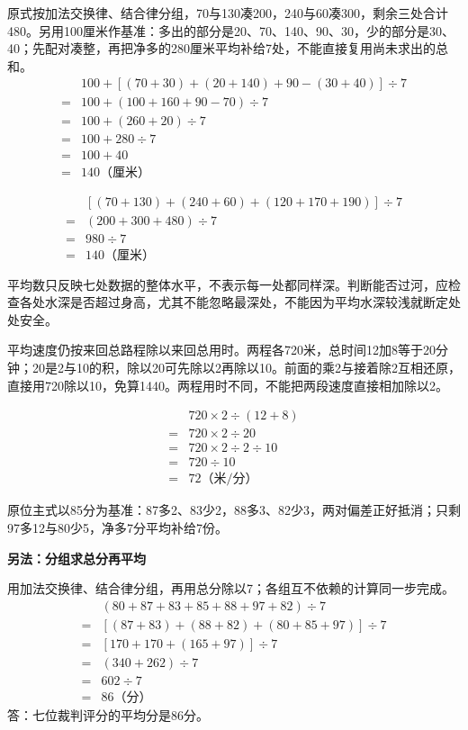 \documentclass[multi=snippet,border=0pt]{standalone}
\newenvironment{snippet}[3]{\begin{minipage}{#1bp}\color{answerred}\fontsize{#2}{#3}\selectfont\raggedright}{\end{minipage}}
\begin{document}
\begin{snippet}{505}{11.5}{14}原式按加法交换律、结合律分组，70与130凑200，240与60凑300，剩余三处合计480。另用100厘米作基准：多出的部分是20、70、140、90、30，少的部分是30、40；先配对凑整，再把净多的280厘米平均补给7处，不能直接复用尚未求出的总和。\[\begin{aligned}&100+[(70+30)+(20+140)+90-(30+40)]\div7\\={}&100+(100+160+90-70)\div7\\={}&100+(260+20)\div7\\={}&100+280\div7\\={}&100+40\\={}&140\text{（厘米）}\end{aligned}\]\end{snippet}
\begin{snippet}{369}{10.5}{12.8}\[\begin{aligned}&[(70+130)+(240+60)+(120+170+190)]\div7\\={}&(200+300+480)\div7\\={}&980\div7\\={}&140\text{（厘米）}\end{aligned}\]\end{snippet}
\begin{snippet}{505}{11.5}{14}平均数只反映七处数据的整体水平，不表示每一处都同样深。判断能否过河，应检查各处水深是否超过身高，尤其不能忽略最深处，不能因为平均水深较浅就断定处处安全。\end{snippet}
\begin{snippet}{505}{11.5}{14}平均速度仍按来回总路程除以来回总用时。两程各720米，总时间12加8等于20分钟；20是2与10的积，除以20可先除以2再除以10。前面的乘2与接着除2互相还原，直接用720除以10，免算1440。两程用时不同，不能把两段速度直接相加除以2。\end{snippet}
\begin{snippet}{344}{10.5}{12.8}\[\begin{aligned}&720\times2\div(12+8)\\={}&720\times2\div20\\={}&720\times2\div2\div10\\={}&720\div10\\={}&72\text{（米/分）}\end{aligned}\]\end{snippet}
\begin{snippet}{505}{11.5}{14}原位主式以85分为基准：87多2、83少2，88多3、82少3，两对偏差正好抵消；只剩97多12与80少5，净多7分平均补给7份。\par\textbf{另法：分组求总分再平均}\par 用加法交换律、结合律分组，再用总分除以7；各组互不依赖的计算同一步完成。\[\begin{aligned}&(80+87+83+85+88+97+82)\div7\\={}&[(87+83)+(88+82)+(80+85+97)]\div7\\={}&[170+170+(165+97)]\div7\\={}&(340+262)\div7\\={}&602\div7\\={}&86\text{（分）}\end{aligned}\]答：七位裁判评分的平均分是86分。\end{snippet}
\end{document}
